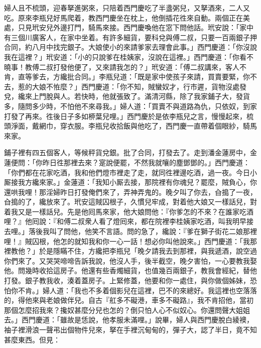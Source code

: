 婦人且不梳頭，迎春拏進粥來，只陪着西門慶吃了半盞粥兒，又拏酒來，二人又吃。原來李瓶兒好馬爬着，教西門慶坐在枕上，他倒插花徃來自動。兩個正在美處，只見玳安兒外邊打門，騎馬來接。西門慶喚他在窓下問他話。玳安說：「家中有三個川廣客人，在家中坐着。有許多細貨，要科兌與傅二叔，只要一百兩銀子押合同，約八月中找完銀子。大娘使小的來請爹家去理會此事。」{}西門慶道：「你沒說我在這裡？」玳安道：「小的只說爹在桂姨家，沒說在這裡。」西門慶道：「你看不曉事！教傅二叔打發他便了，又來請我怎的？」玳安道：「傅二叔講來，客人不肯，直等爹去，方纔批合同。」李瓶兒道：「既是家中使孩子來請，買賣要緊，你不去，惹的大娘不恠麼？」西門慶道：「你不知，賊蠻奴才，行市遲，貨物沒處發兌，纔來上門脫與人。{}若快時，他就張致了。滿清河縣，除了我家鋪子大，發貨多，隨問多少時，不怕他不來尋我。」{}婦人道：「買賣不與道路為仇，{}只依奴，到家打發了再來。徃後日子多如桺葉兒哩。」西門慶於是依李瓶兒之言，慢慢起來，梳頭淨面，戴網巾，穿衣服。李瓶兒收拾飯與他吃了，西門慶一直帶着個眼紗，騎馬來家。

鋪子裡有四五個客人，等候秤貨兌銀。批了合同，打發去了。走到潘金蓮房中，金蓮便問：「你昨日徃那裡去來？寔說便罷，不然我就嚷的塵鄧鄧的。」西門慶道：「你們都在花家吃酒，我和他們燈市裡走了走，就同徃裡邊吃酒，過一夜。今日小厮接我方纔來家。」金蓮道：「我知小厮去接，那院裡有你魂兒？罷麼，賊負心，你還哄我哩！那淫婦昨日打發俺們來了，弄神弄鬼的。晚夕叫了你去，㒲搗了一夜，㒲搗的了，纔放來了。{}玳安這賊囚根子，久慣兒牢成，對着他大娘又一樣話兒，對着我又是一樣話兒。先是他囘馬來家，他大娘問他：『你爹怎的不來？在誰家吃酒哩？』他囘說：『和傅二叔衆人看了燈囘來，都在院裡李桂姨家吃酒，叫我明早接去哩。」落後我叫了問他，他笑不言語。問的急了，{}纔說：『爹在獅子街花二娘那裡哩！』賊囚根，他怎的就知我和你一心一話！想必你叫他說來。」西門慶道：「我那裡教他？」於是隱瞞不住，方纔把李瓶兒「晚夕請我去到那裡，與我遞酒，說空過你們來了。又哭哭啼啼告訴我說，他沒人手，後半截空，晚夕害怕，一心要教我娶他。問幾時收拾這房子。他還有些香燭細貨，也值幾百兩銀子，教我會經紀，替他打發。銀子教我收，湊着蓋房子。上緊修蓋，他要和你一處住，與你做個姊妹，恐怕你不肯。」{}婦人道：「我也不多着個影兒在這裡，巴不的來總好。我這裡也空落落的，得他來與老娘做伴兒。自古『舡多不礙港，車多不礙路』，我不肯招他，當初那個怎麼招我來？攙奴甚麼分兒也怎的？倒只怕人心不似奴心。{}{}你還問聲大姐姐去。」西門慶道：「雖故是恁說，他孝服未滿哩。」說畢，婦人與西門慶脫白綾襖，袖子裡滑浪一聲弔出個物件兒來，{}拏在手裡沉甸甸的，彈子大，認了半日，竟不知甚麼東西。但見：

